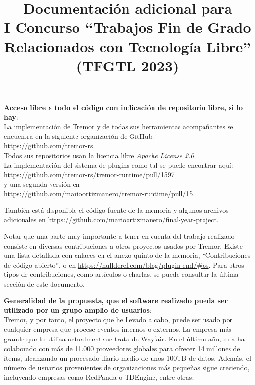 \documentclass[a4paper,12pt,twoside,hidelinks,openright]{article}
\begin{document}
\newpage

\title{Documentación adicional para\\I Concurso ``Trabajos Fin de Grado
Relacionados con Tecnología Libre''\\(TFGTL 2023)}
\date{}


\begingroup
\setlength{\parskip}{\baselineskip}%
\setlength{\parindent}{0pt}%

\maketitle

\textbf{Acceso libre a todo el código con indicación de repositorio libre, si lo
hay}:\\
La implementación de Tremor y de todas sus herramientas acompañantes se
encuentra en la siguiente organización de GitHub:\\
\url{https://github.com/tremor-rs}.\\ Todos sus repositorios usan la licencia
libre \emph{Apache License 2.0}.\\
La implementación del sistema de plugins como tal se puede encontrar aquí:\\
\url{https://github.com/tremor-rs/tremor-runtime/pull/1597}\\
y una segunda versión en\\
\url{https://github.com/marioortizmanero/tremor-runtime/pull/15}.

También está disponible el código fuente de la memoria y algunos archivos
adicionales en \url{https://github.com/marioortizmanero/final-year-project}.

Notar que una parte muy importante a tener en cuenta del trabajo realizado
consiste en diversas contribuciones a otros proyectos usados por Tremor. Existe
una lista detallada con enlaces en el anexo quinto de la memoria,
``Contribuciones de código abierto'', o en
\url{https://nullderef.com/blog/plugin-end/#os}. Para otros tipos de
contribuciones, como artículos o charlas, se puede consultar la última sección
de este documento.

\textbf{Generalidad de la propuesta, que el software realizado pueda ser
utilizado por un grupo amplio de usuarios}:\\
Tremor, y por tanto, el proyecto que he llevado a cabo, puede ser usado por
cualquier empresa que procese eventos internos o externos. La empresa más grande
que lo utiliza actualmente se trata de Wayfair. En el último año, esta ha
colaborado con más de 11.000 proveedores globales para ofrecer 14 millones de
ítems, alcanzando un procesado diario medio de unos 100TB de datos.  Además, el
número de usuarios provenientes de organizaciones más pequeñas sigue creciendo,
incluyendo empresas como RedPanda o TDEngine, entre otras:
\end{document}
